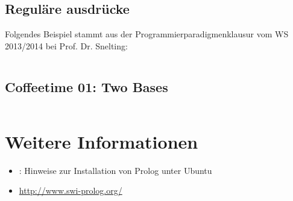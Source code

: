 \subsection{Reguläre ausdrücke}
Folgendes Beispiel stammt aus der Programmierparadigmenklausur vom WS 2013/2014
bei Prof. Dr. Snelting:

\inputminted[numbersep=5pt, tabsize=4]{prolog}{scripts/prolog/regex.pl}

\subsection{Coffeetime 01: Two Bases}

\inputminted[numbersep=5pt, tabsize=4]{prolog}{scripts/prolog/01-two-bases.prolog}

\section{Weitere Informationen}
\begin{itemize}
    \item \href{http://wiki.ubuntuusers.de/Prolog}{}: Hinweise zur Installation von Prolog unter Ubuntu
    \item \url{http://www.swi-prolog.org/}
\end{itemize}
